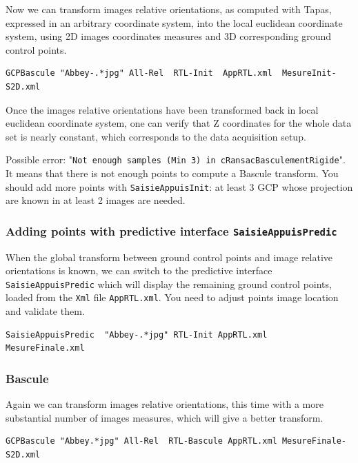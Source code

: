 Now we can transform images relative orientations, as computed with Tapas, expressed in an arbitrary coordinate system,
into the local euclidean coordinate system, using 2D images coordinates measures and 3D corresponding ground control points. 

\begin{verbatim}
GCPBascule "Abbey-.*jpg" All-Rel  RTL-Init  AppRTL.xml  MesureInit-S2D.xml 
\end{verbatim}

Once the images relative orientations have been transformed back in local euclidean coordinate system, one can verify that Z coordinates for the whole data set is nearly constant, which corresponds to the data acquisition setup.

\vspace{\baselineskip}
Possible error: "{\tt Not enough samples (Min 3) in cRansacBasculementRigide}". It means that there is not enough points to compute a Bascule transform. You should add more points with {\tt SaisieAppuisInit}:
at least 3 GCP whose projection are known in at least 2 images are needed.

\subsubsection{Adding points with predictive interface {\tt SaisieAppuisPredic}}

When the global transform between ground control points and image relative orientations is known, we can switch to the predictive interface {\tt SaisieAppuisPredic} which will display the remaining ground control points, loaded from the {\tt Xml} file {\tt AppRTL.xml}.
You need to adjust points image location and validate them.

\begin{verbatim}
SaisieAppuisPredic  "Abbey-.*jpg" RTL-Init AppRTL.xml  MesureFinale.xml
\end{verbatim}

\subsubsection{Bascule}

Again we can transform images relative orientations, this time with a more substantial number of images measures, which will give a better transform.
\begin{verbatim}
GCPBascule "Abbey.*jpg" All-Rel  RTL-Bascule AppRTL.xml MesureFinale-S2D.xml
\end{verbatim}


